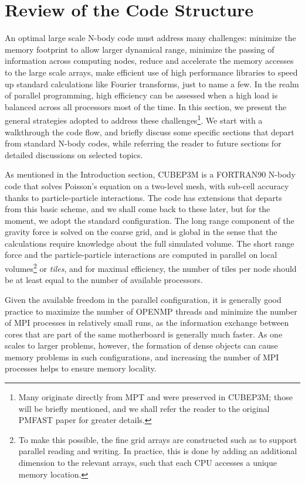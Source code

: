
\section{Review of the Code Structure}
\label{sec:structure}


An optimal large scale N-body code must address many challenges: minimize the memory footprint to allow larger dynamical range,
minimize the passing of information across computing nodes, reduce and accelerate the memory accesses to the large scale arrays, 
make efficient use of high performance libraries to speed up standard calculations like Fourier transforms, just to name a few.
In the realm of parallel programming, high efficiency  can be assessed when a high load is balanced across all processors
most of the time. In this section, we present the general strategies adopted to address these challenges\footnote{ 
Many originate directly from MPT and were preserved in {\small CUBEP3M};
those will be briefly mentioned, and we shall refer the reader to the original PMFAST paper for greater details.}.
We start with a walkthrough the code flow, and briefly discuss some specific sections that depart from standard N-body codes,
while referring the reader to future sections for detailed discussions on selected topics.


As mentioned in the Introduction section, {\small CUBEP3M} is a {\small FORTRAN90} 
N-body code that solves Poisson's equation on a two-level mesh, 
with sub-cell accuracy thanks to particle-particle interactions. 
The code has extensions that departs from this basic scheme, and
we shall come back to these later, but for the moment, we adopt the 
standard configuration. 
The long range component of the gravity force is solved on the coarse grid, 
and is global in the sense that the calculations require knowledge about the full simulated volume.
The short range force and the particle-particle interactions are computed in parallel on local volumes\footnote{To make this possible, the fine grid arrays are constructed such as to support parallel reading and writing. In practice, this is done by adding an additional dimension to the relevant arrays, such that each {\small CPU} accesses a unique memory location.} or {\it tiles},
and for maximal efficiency, the number of tiles per node should be at least equal to the number of available processors.

Given the available freedom in the parallel configuration, it is generally good practice to maximize the number of {\small OPENMP} threads and minimize the number of {\small MPI} processes in relatively small runs, as the information exchange between cores that are part of the same motherboard is generally much faster.
As one scales to larger problems, however, the formation of dense objects can cause memory problems in such configurations, and increasing 
the number of {\small MPI} processes helps to ensure memory locality.



